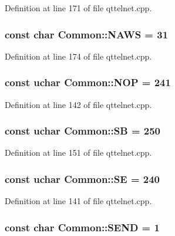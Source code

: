 Definition at line 171 of file qttelnet.cpp.

\hypertarget{namespaceCommon_a4f9f0651e0a3ecc79de29a55ab9cf820}{
\subsubsection[{NAWS}]{\setlength{\rightskip}{0pt plus 5cm}const char {\bf Common::NAWS} = 31}}
\label{namespaceCommon_a4f9f0651e0a3ecc79de29a55ab9cf820}


Definition at line 174 of file qttelnet.cpp.

\hypertarget{namespaceCommon_a0e59839d3c83c0730d083866e0660b43}{
\subsubsection[{NOP}]{\setlength{\rightskip}{0pt plus 5cm}const uchar {\bf Common::NOP} = 241}}
\label{namespaceCommon_a0e59839d3c83c0730d083866e0660b43}


Definition at line 142 of file qttelnet.cpp.

\hypertarget{namespaceCommon_a8f9329beba94b73b67546aa68de2b999}{
\subsubsection[{SB}]{\setlength{\rightskip}{0pt plus 5cm}const uchar {\bf Common::SB} = 250}}
\label{namespaceCommon_a8f9329beba94b73b67546aa68de2b999}


Definition at line 151 of file qttelnet.cpp.

\hypertarget{namespaceCommon_a0c4113e7abc4d20f03b776ea5dad7708}{
\subsubsection[{SE}]{\setlength{\rightskip}{0pt plus 5cm}const uchar {\bf Common::SE} = 240}}
\label{namespaceCommon_a0c4113e7abc4d20f03b776ea5dad7708}


Definition at line 141 of file qttelnet.cpp.

\hypertarget{namespaceCommon_a897723bcf2aba172705240f146910355}{
\subsubsection[{SEND}]{\setlength{\rightskip}{0pt plus 5cm}const char {\bf Common::SEND} = 1}}
\label{namespaceCommon_a897723bcf2aba172705240f146910355}


